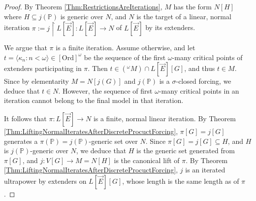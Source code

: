 \documentclass{article}
\theoremstyle{definition}
\theoremstyle{plain}
\newcommand{\po}{\mathbb{P}}
\newcommand{\la}{\langle}
\newcommand{\ra}{\rangle}
\newcommand{\uhr}{\upharpoonright}
\begin{document}
\begin{proof}
    By Theorem \ref{Thm:RestrictionsAreIterations}, $M$ has the form $N[H]$ where $H\subseteq j(\po)$ is generic over $N$, and $N$ is the target of a linear, normal iteration  $\pi:=j\uhr L[\vec{E}] \colon L[\vec{E}]\to N $ of $L[\vec E]$ by its extenders. 
    
    We argue that $\pi$ is a finite iteration. Assume otherwise, and let $t = \la \kappa_n \colon n<\omega \ra\in [\mbox{Ord}]^{\omega}$ be the sequence of the first $\omega$-many critical points of extenders participating in $\pi$. Then $t\in ({}^\omega M)\cap L[\vec E][G]$, and thus $t\in M$. Since by elementarity $M = N[ j(G) ]$ and $j(\po)$ is a $\sigma$-closed forcing, we deduce that $t\in N$. However, the sequence of first $\omega$-many critical points in an iteration cannot belong to the final model in that iteration.

    It follows that $\pi\colon L[\vec E]\to N$ is a finite, normal linear iteration. By Theorem \ref{Thm:LiftingNormalIteratesAfterDiscreteProcuctForcing},  $\pi[G] = j[G]$ generates a $\pi(\po) = j(\po)$-generic set  over $N$.  Since $\pi[G] = j[G]\subseteq H$, and $H$ is $j(\po)$-generic over $N$, we deduce that $H$ is the generic set generated from $\pi[G]$, and $j\colon V[G]\to M = N[H]$ is the canonical lift of $\pi$. By Theorem \ref{Thm:LiftingNormalIteratesAfterDiscreteProcuctForcing}, $j$ is an iterated ultrapower by extenders on $L[\vec {E}][G]$, whose length is the same length as of $\pi$.
\end{proof}
\end{document}
